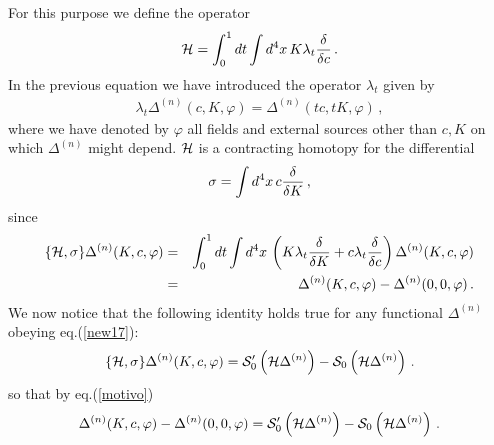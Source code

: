 \documentclass[a4paper,11pt]{article}
\begin{document}
For this purpose we define the operator~\cite{ZUMINO}
%
\begin{eqnarray}
{\cal H} = \int_0^1 dt \int d^4x \,
K \lambda_t {\delta \over \delta c} \, .
\label{ch}
\end{eqnarray}
%
In the previous equation we have introduced the operator $\lambda_t$ given by
%
\begin{eqnarray}
\lambda_t \Delta^{(n)}(c,K,\varphi) = \Delta^{(n)}(tc, tK,\varphi) \, ,
\label{new19b.bis}
\end{eqnarray}
%
where we have denoted by $\varphi$ all fields and external sources other than $c,K$ on which
$\Delta^{(n)}$ might depend.
%
${\cal H}$
is a contracting homotopy for the differential 
%
\begin{eqnarray}
\sigma = \int d^4x \,  c {\delta \over \delta K} \, ,
\label{diff}
\end{eqnarray}
%
since
%
\begin{eqnarray}
\{ {\cal H}, \sigma \} \Delta^{(n)}(K,c,\varphi)  & = &
\int_0^1  dt \int d^4x \, 
\left ( K \lambda_t {\delta \over \delta K} + c \lambda_t {\delta \over \delta c} 
\right ) \Delta^{(n)}(K,c,\varphi) \nonumber \\
& = & 
 \Delta^{(n)}(K,c,\varphi)  - \Delta^{(n)}(0,0,\varphi) \, .
\label{motivo}
\end{eqnarray}
%
We now notice that the following identity holds true for any 
functional $\Delta^{(n)}$ obeying eq.(\ref{new17}):
%
\begin{eqnarray}
\{ {\cal H}, \sigma \} \Delta^{(n)}(K,c,\varphi) = 
{\cal S}'_0 \left ( {\cal H} \Delta^{(n)} \right )  - 
{\cal S}_0 \left( {\cal H} \Delta^{(n)}\right)
 \, .
\label{new20_1}
\end{eqnarray}
%
so that  by eq.(\ref{motivo})
%
\begin{eqnarray}
\Delta^{(n)}(K,c,\varphi) - \Delta^{(n)}(0,0,\varphi) = 
{\cal S}'_0 \left ( {\cal H} \Delta^{(n)} \right )  - 
{\cal S}_0 \left( {\cal H} \Delta^{(n)}\right)
 \, .
\label{new20}
\end{eqnarray}
\end{document}
